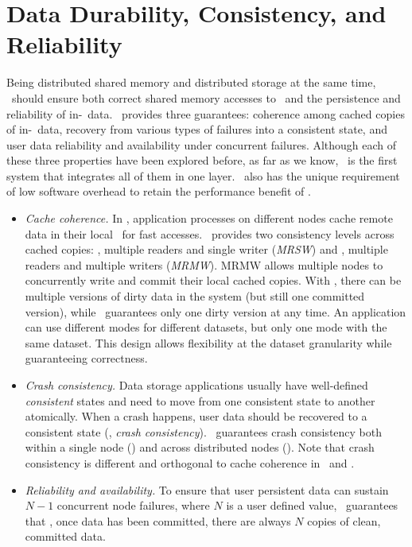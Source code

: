 \section{Data Durability, Consistency, and Reliability}
\label{sec:hotpot:xact}

Being distributed shared memory and distributed storage at the same time,
\dsnvm\ should ensure both correct shared memory accesses to \nvm\
and the persistence and reliability of in-\nvm\ data. 
\hotpot\ provides three guarantees: coherence among cached copies of in-\nvm\ data,
recovery from various types of failures into a consistent state,
and user data reliability and availability under concurrent failures.
Although each of these three properties have been explored before,
as far as we know, \hotpot\ is the first system that integrates all of them in one layer.
\hotpot\ also has the unique requirement of low software overhead to retain the performance benefit of \nvm.

\begin{itemize}
\item{\em Cache coherence.} 
In \hotpot, application processes on different nodes cache remote data in their local \nvm\ for fast accesses.
\hotpot\ provides two consistency levels across cached copies: 
{\em \ra}, multiple readers and single writer ({\em MRSW}) 
and {\em \rb}, multiple readers and multiple writers ({\em MRMW}).
MRMW allows multiple nodes to concurrently write and commit their local cached copies.
With \mrmw, there can be multiple versions of dirty data in the system (but still one committed version),
while \mrsw\ guarantees only one dirty version at any time.
An application can use different modes for different datasets,
but only one mode with the same dataset.
This design allows flexibility at the dataset granularity while guaranteeing correctness.
 
\item{\em Crash consistency.} 
Data storage applications usually have well-defined {\em consistent} states and need to move from 
one consistent state to another atomically.
When a crash happens, 
user data should be recovered to a consistent state ({\ie, \em crash consistency}). 
\hotpot\ guarantees crash consistency both within a single node ({\em \rcs}) and across distributed nodes ({\em \rcm}).
Note that crash consistency is different and orthogonal to cache
coherence in \ra\ and \rb. 

\item{\em Reliability and availability.} 
To ensure that user persistent data can sustain $N-1$ concurrent node failures, 
where $N$ is a user defined value, \hotpot\ guarantees that {\em \re}, once data has 
been committed, there are always $N$ copies of clean, committed data.

\end{itemize}

